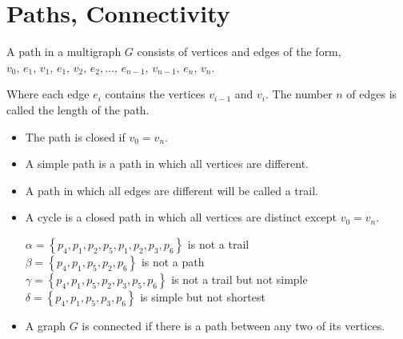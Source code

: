 \documentclass[12pt,oneside,a4paper]{book}
\theoremstyle{remark}
\theoremstyle{definition}
\newcommand{\set}[1]{\left\{#1\right\}}
\begin{document}
\section{Paths, Connectivity}
A path in a multigraph $ G $ consists of vertices and edges of the form,\\
\indent\indent $ v_0,\,e_1,\,v_1,\,e_1,\,v_2,\,e_2,\dots,\,e_{n-1},\,v_{n-1},\,e_n,\,v_n $.

Where each edge $ e_i $ contains the vertices $ v_{i-1} $ and $ v_i $. The number $ n $ of edges is called the length of the path.
\begin{itemize}
    \item The path is closed if $ v_0=v_n $.
    \item A simple path is a path in which all vertices are different.
    \item A path in which all edges are different will be called a trail.
    \item A cycle is a closed path in which all vertices are distinct except $ v_0=v_n $.\\
    \begin{center}
    \end{center}
    $ \alpha=\set{p_4,p_1,p_2,p_5,p_1,p_2,p_3,p_6} $ is not a trail\\
    $ \beta=\set{p_4,p_1,p_5,p_2,p_6} $ is not a path\\
    $ \gamma=\set{p_4,p_1,p_5,p_2,p_3,p_5,p_6} $ is not a trail but not simple\\
    $ \delta=\set{p_4,p_1,p_5,p_3,p_6} $ is simple but not shortest\\
    \item A graph $ G $ is connected if there is a path between any two of its vertices.

\end{itemize}
\end{document}
